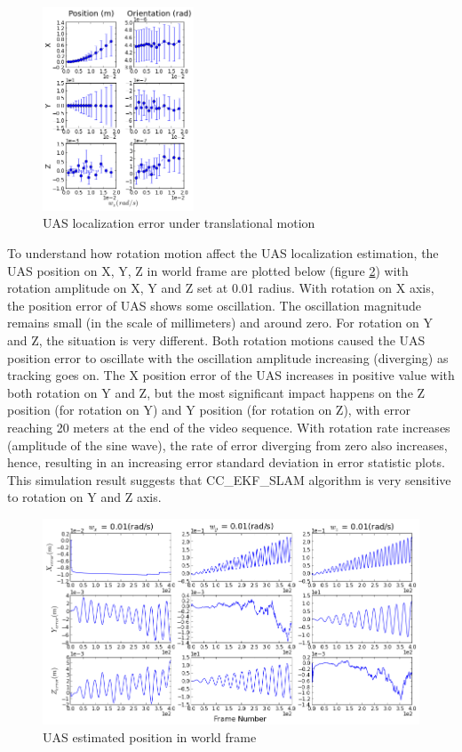\begin{figure}[h]
  \includegraphics[width=4.5cm, keepaspectratio=true]{./Figures/SimulationFigures/Figure13.png}
  \caption{UAS localization error under translational 
  \label{fig:simfig9-10}
    motion}
  
\end{figure}

To understand how rotation motion affect the UAS localization
estimation, the UAS position on X, Y, Z in world frame are plotted
below (figure \ref{fig:simfig14}) with rotation amplitude on X, Y and
Z set at 0.01 radius. With rotation on X axis, the position error of
UAS shows some oscillation. The oscillation magnitude remains small
(in the scale of millimeters) and around zero. For rotation on Y and
Z, the situation is very different. Both rotation motions caused the
UAS position error to oscillate with the oscillation amplitude
increasing (diverging) as tracking goes on. The X position error of
the UAS increases in positive value with both rotation on Y and Z, but
the most significant impact happens on the Z position (for rotation on
Y) and Y position (for rotation on Z), with error reaching 20 meters
at the end of the video sequence. With rotation rate increases
(amplitude of the sine wave), the rate of error diverging from zero
also increases, hence, resulting in an increasing error standard
deviation in error statistic plots. This simulation result suggests
that CC\_EKF\_SLAM algorithm is very sensitive to rotation on Y and Z
axis.

\begin{figure}[h]
  \centering
  \includegraphics[width=14cm, keepaspectratio=true]{./Figures/SimulationFigures/Figure14.png}
  \caption{UAS estimated position in world frame}
  \label{fig:simfig14}
\end{figure}

